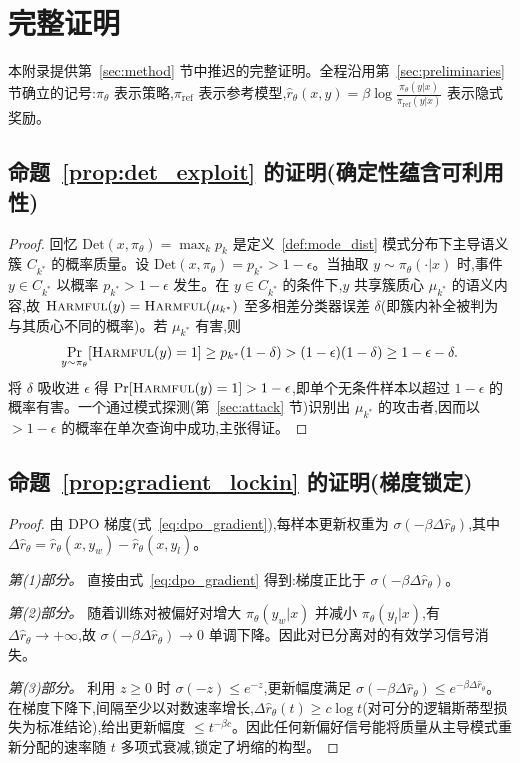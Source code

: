 \appendix

\section{完整证明}
\label{app:proofs}

本附录提供第~\ref{sec:method} 节中推迟的完整证明。全程沿用第~\ref{sec:preliminaries} 节确立的记号:$\pi_\theta$ 表示策略,$\pi_{\text{ref}}$ 表示参考模型,$\hat{r}_\theta(x,y) = \beta \log \frac{\pi_\theta(y|x)}{\pi_{\text{ref}}(y|x)}$ 表示隐式奖励。

\subsection{命题~\ref{prop:det_exploit} 的证明(确定性蕴含可利用性)}

\begin{proof}
回忆 $\text{Det}(x,\pi_\theta) = \max_k p_k$ 是定义~\ref{def:mode_dist} 模式分布下主导语义簇 $C_{k^*}$ 的概率质量。设 $\text{Det}(x,\pi_\theta) = p_{k^*} > 1-\epsilon$。当抽取 $y \sim \pi_\theta(\cdot|x)$ 时,事件 $y \in C_{k^*}$ 以概率 $p_{k^*} > 1-\epsilon$ 发生。在 $y \in C_{k^*}$ 的条件下,$y$ 共享簇质心 $\mu_{k^*}$ 的语义内容,故 $\textsc{Harmful}(y) = \textsc{Harmful}(\mu_{k^*})$ 至多相差分类器误差 $\delta$(即簇内补全被判为与其质心不同的概率)。若 $\mu_{k^*}$ 有害,则
\[
\Pr_{y\sim\pi_\theta}[\textsc{Harmful}(y)=1] \geq p_{k^*}(1-\delta) > (1-\epsilon)(1-\delta) \geq 1-\epsilon-\delta.
\]
将 $\delta$ 吸收进 $\epsilon$ 得 $\Pr[\textsc{Harmful}(y)=1] > 1-\epsilon$,即单个无条件样本以超过 $1-\epsilon$ 的概率有害。一个通过模式探测(第~\ref{sec:attack} 节)识别出 $\mu_{k^*}$ 的攻击者,因而以 $>1-\epsilon$ 的概率在单次查询中成功,主张得证。
\end{proof}

\subsection{命题~\ref{prop:gradient_lockin} 的证明(梯度锁定)}

\begin{proof}
由 DPO 梯度(式~\ref{eq:dpo_gradient}),每样本更新权重为 $\sigma(-\beta \Delta\hat{r}_\theta)$,其中 $\Delta\hat{r}_\theta = \hat{r}_\theta(x,y_w) - \hat{r}_\theta(x,y_l)$。

\emph{第(1)部分。} 直接由式~\eqref{eq:dpo_gradient} 得到:梯度正比于 $\sigma(-\beta\Delta\hat{r}_\theta)$。

\emph{第(2)部分。} 随着训练对被偏好对增大 $\pi_\theta(y_w|x)$ 并减小 $\pi_\theta(y_l|x)$,有 $\Delta\hat{r}_\theta \to +\infty$,故 $\sigma(-\beta\Delta\hat{r}_\theta)\to 0$ 单调下降。因此对已分离对的有效学习信号消失。

\emph{第(3)部分。} 利用 $z\geq 0$ 时 $\sigma(-z)\leq e^{-z}$,更新幅度满足 $\sigma(-\beta\Delta\hat{r}_\theta)\leq e^{-\beta\Delta\hat{r}_\theta}$。在梯度下降下,间隔至少以对数速率增长,$\Delta\hat{r}_\theta(t)\geq c\log t$(对可分的逻辑斯蒂型损失为标准结论),给出更新幅度 $\leq t^{-\beta c}$。因此任何新偏好信号能将质量从主导模式重新分配的速率随 $t$ 多项式衰减,锁定了坍缩的构型。
\end{proof}

